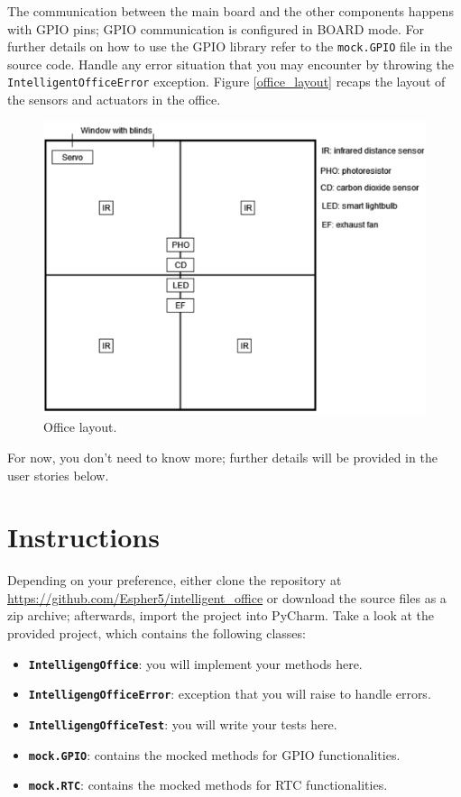 The communication between the main board and the other components happens with GPIO pins; GPIO communication is configured in BOARD mode. For further details on how to use the GPIO library refer to the \texttt{mock.GPIO} file in the source code.
Handle any error situation that you may encounter by throwing the \texttt{IntelligentOfficeError} exception.
Figure \ref{office_layout} recaps the layout of the sensors and actuators in the office.

\begin{figure}[H]
    \centering
    \includegraphics[width=\linewidth]{figures/appendix/intelligent_office.png}
    \caption{Office layout.}
    \label{office_layout.}
\end{figure}

For now, you don't need to know more; further details will be provided in the user stories below.

\section{Instructions}
Depending on your preference, either clone the repository at \url{https://github.com/Espher5/intelligent_office} or download the source files as a zip archive; afterwards, import the project into PyCharm. 
Take a look at the provided project, which contains the following classes: 
\begin{itemize}
    \item \textbf{\texttt{IntelligengOffice}}: you will implement your methods here.
    \item \textbf{\texttt{IntelligengOfficeError}}: exception that you will raise to handle errors.
    \item \textbf{\texttt{IntelligengOfficeTest}}: you will write your tests here.
    \item \textbf{\texttt{mock.GPIO}}: contains the mocked methods for GPIO functionalities.
    \item \textbf{\texttt{mock.RTC}}: contains the mocked methods for RTC functionalities.
\end{itemize}

